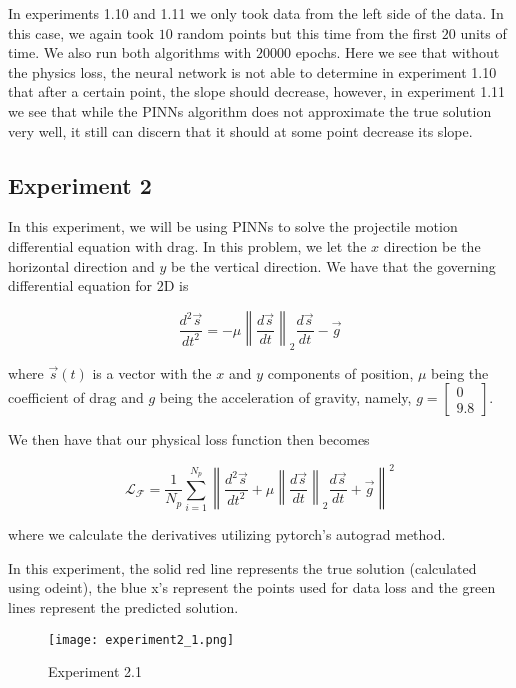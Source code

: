 \documentclass{article}
\begin{document}
In experiments 1.10 and 1.11 we only took data from the left side of the data. In this case, we again took $10$ random points but this time from the first $20$ units of time. We also run both algorithms with $20000$ epochs. Here we see that without the physics loss, the neural network is not able to determine in experiment 1.10 that after a certain point, the slope should decrease, however, in experiment 1.11 we see that while the PINNs algorithm does not approximate the true solution very well, it still can discern that it should at some point decrease its slope.

\subsection*{Experiment 2}

In this experiment, we will be using PINNs to solve the projectile motion differential equation with drag. In this problem, we let the $x$ direction be the horizontal direction and $y$ be the vertical direction. We have that the governing differential equation for $2$D is

$$\frac{d^2 \Vec{s}}{dt^2} = - \mu \left \lVert 
\frac{d \Vec{s}}{dt} \right\rVert_2 \frac{d \Vec{s}}{dt} - \Vec{g}$$

where $\Vec{s}(t)$ is a vector with the $x$ and $y$ components of position, $\mu$ being the coefficient of drag and $g$ being the acceleration of gravity, namely, $g = \begin{bmatrix}
    0\\
    9.8
\end{bmatrix}$.

We then have that our physical loss function then becomes

$$\mathcal{L}_{\mathcal{F}} = \frac{1}{N_{p}}\sum_{i = 1}^{N_{p}} \left\lVert \frac{d^2 \Vec{s}}{dt^2} + \mu \left \lVert 
\frac{d \Vec{s}}{dt} \right\rVert_2 \frac{d \Vec{s}}{dt} + \Vec{g} \right\rVert^2$$

where we calculate the derivatives utilizing pytorch's autograd method.

In this experiment, the solid red line represents the true solution (calculated using odeint), the blue x's represent the points used for data loss and the green lines represent the predicted solution.

\begin{figure}[H]
    \centering
    \texttt{[image: experiment2\_1.png]}
    \caption{Experiment 2.1}
\end{figure}
\end{document}
